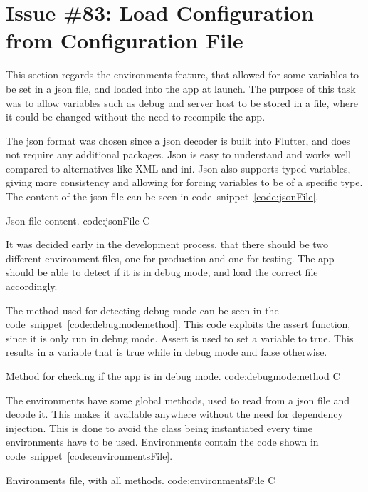  \section{Issue \#83: Load Configuration from Configuration File}
\label{sect:environments}
This section regards the environments feature, that allowed for some variables to be set in a json file, and loaded into the app at launch. The purpose of this task was to allow variables such as debug and server host to be stored in a file, where it could be changed without the need to recompile the app. 

The json format was chosen since a json decoder is built into Flutter, and does not require any additional packages. Json is easy to understand and works well compared to alternatives like XML and ini. Json also supports typed variables, giving more consistency and allowing for forcing variables to be of a specific type. The content of the json file can be seen in code~snippet~\ref{code:jsonFile}.

        {Json file content.} %
        {code:jsonFile} %
        {C} %

It was decided early in the development process, that there should be two different environment files, one for production and one for testing. The app should be able to detect if it is in debug mode, and load the correct file accordingly.

The method used for detecting debug mode can be seen in the code~snippet~\ref{code:debugmodemethod}. This code exploits the assert function, since it is only run in debug mode. Assert is used to set a variable to true. This results in a variable that is true while in debug mode and false otherwise.

        {Method for checking if the app is in debug mode.} %
        {code:debugmodemethod} %
        {C} %

The environments have some global methods, used to read from a json file and decode it. This makes it available anywhere without the need for dependency injection. This is done to avoid the class being instantiated every time environments have to be used. Environments contain the code shown in code~snippet~\ref{code:environmentsFile}.

        {Environments file, with all methods.} %
        {code:environmentsFile} %
        {C} %
